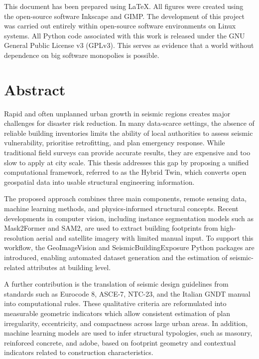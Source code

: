 This document has been prepared using LaTeX. All figures were created using the open-source software Inkscape and GIMP. The development of this project was carried out entirely within open-source software environments on Linux systems. All Python code associated with this work is released under the GNU General Public License v3 (GPLv3). This serves as evidence that a world without dependence on big software monopolies is possible. 

\section*{Abstract}

Rapid and often unplanned urban growth in seismic regions creates major challenges for disaster risk reduction. In many data-scarce settings, the absence of reliable building inventories limits the ability of local authorities to assess seismic vulnerability, prioritise retrofitting, and plan emergency response. While traditional field surveys can provide accurate results, they are expensive and too slow to apply at city scale. This thesis addresses this gap by proposing a unified computational framework, referred to as the Hybrid Twin, which converts open geospatial data into usable structural engineering information.

The proposed approach combines three main components, remote sensing data, machine learning methods, and physics-informed structural concepts. Recent developments in computer vision, including instance segmentation models such as Mask2Former and SAM2, are used to extract building footprints from high-resolution aerial and satellite imagery with limited manual input. To support this workflow, the GeoImageVision and SeismicBuildingExposure Python packages are introduced, enabling automated dataset generation and the estimation of seismic-related attributes at building level.

A further contribution is the translation of seismic design guidelines from standards such as Eurocode 8, ASCE-7, NTC-23, and the Italian GNDT manual into computational rules. These qualitative criteria are reformulated into measurable geometric indicators which allow consistent estimation of plan irregularity, eccentricity, and compactness across large urban areas. In addition, machine learning models are used to infer structural typologies, such as masonry, reinforced concrete, and adobe, based on footprint geometry and contextual indicators related to construction characteristics.

